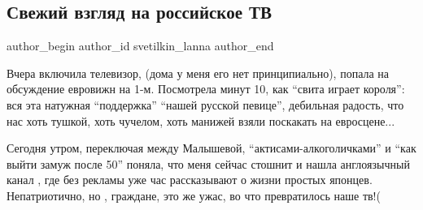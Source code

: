  
 
 
 
 
 
\subsection{Свежий взгляд на российское ТВ}
\label{sec:23_05_2021.fb.svetilkin_lanna.1.rostv}
\ifcmt
 author_begin
   author_id svetilkin_lanna
 author_end
\fi

Вчера включила телевизор, (дома у меня его нет принципиально), попала на
обсуждение евровижн  на 1-м.  Посмотрела минут 10, как \enquote{свита играет короля}:
вся эта натужная \enquote{поддержка} \enquote{нашей русской певице}, дебильная радость, что нас
хоть тушкой, хоть чучелом, хоть манижей взяли поскакать на евросцене...

Сегодня утром, переключая между Малышевой, \enquote{актисами-алкоголичками} и
\enquote{как выйти замуж после 50} поняла, что меня сейчас стошнит и нашла
англоязычный канал , где без рекламы уже час рассказывают о жизни простых
японцев.  Непатриотично, но , граждане, это же ужас, во что превратилось наше
тв!(
